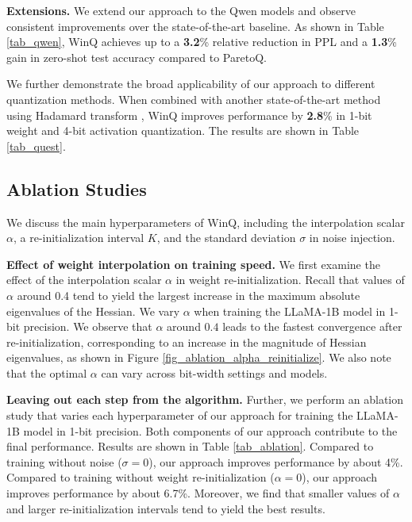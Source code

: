 \documentclass{article}
\theoremstyle{definition}
\newcommand{\acronym}{{\sc WinQ}}
\begin{document}
\textbf{Extensions.} We extend our approach to the Qwen models and observe consistent improvements over the state-of-the-art baseline. As shown in Table \ref{tab_qwen}, \acronym{} achieves up to a \textbf{3.2}\% relative reduction in PPL and a \textbf{1.3}\% gain in zero-shot test accuracy compared to ParetoQ.

We further demonstrate the broad applicability of our approach to different quantization methods. When combined with another state-of-the-art method \citep{panferov2025quest} using Hadamard transform \citep{fast_hadamard_kernel}, \acronym{} improves performance by \textbf{2.8}\% in 1-bit weight and 4-bit activation quantization. The results are shown in Table \ref{tab_quest}.

\subsection{Ablation Studies}\label{sec_ablation}


We discuss the main hyperparameters of \acronym{}, including the interpolation scalar $\alpha$, a re-initialization interval $K$, and the standard deviation $\sigma$ in noise injection. 

\textbf{Effect of weight interpolation on training speed.} We first examine the effect of the interpolation scalar $\alpha$ in weight re-initialization. Recall that values of $\alpha$ around 0.4 tend to yield the largest increase in the maximum absolute eigenvalues of the Hessian. We vary $\alpha$ when training the LLaMA-1B model in 1-bit precision. We observe that $\alpha$ around $0.4$ leads to the fastest convergence after re-initialization, corresponding to an increase in the magnitude of Hessian eigenvalues, as shown in Figure \ref{fig_ablation_alpha_reinitialize}.
We also note that the optimal $\alpha$ can vary across bit-width settings and models. 

\textbf{Leaving out each step from the algorithm.} Further, we perform an ablation study that varies each hyperparameter of our approach for training the LLaMA-1B model in 1-bit precision.
Both components of our approach contribute to the final performance. Results are shown in Table \ref{tab_ablation}. 
Compared to training without noise ($\sigma=0$), our approach improves performance by about 4\%. Compared to training without weight re-initialization ($\alpha=0$), our approach improves performance by about 6.7\%. Moreover, we find that smaller values of $\alpha$ and larger re-initialization intervals tend to yield the best results.
\end{document}
